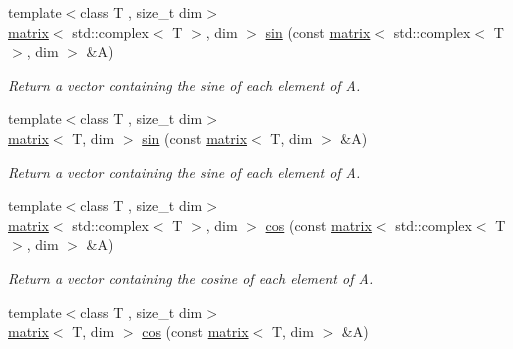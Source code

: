 \begin{DoxyCompactItemize}
\item 
\hypertarget{namespacekeycpp_a18a3ebbda3c25527ae280f5c5725ff4e}{{\footnotesize template$<$class T , size\-\_\-t dim$>$ }\\\hyperlink{classkeycpp_1_1matrix}{matrix}$<$ std\-::complex$<$ T $>$, dim $>$ \hyperlink{namespacekeycpp_a18a3ebbda3c25527ae280f5c5725ff4e}{sin} (const \hyperlink{classkeycpp_1_1matrix}{matrix}$<$ std\-::complex$<$ T $>$, dim $>$ \&A)}\label{namespacekeycpp_a18a3ebbda3c25527ae280f5c5725ff4e}

\begin{DoxyCompactList}\small\item\em Return a vector containing the sine of each element of A. \end{DoxyCompactList}\item 
\hypertarget{namespacekeycpp_aedb234b850e34f9331031d39084fdbb0}{{\footnotesize template$<$class T , size\-\_\-t dim$>$ }\\\hyperlink{classkeycpp_1_1matrix}{matrix}$<$ T, dim $>$ \hyperlink{namespacekeycpp_aedb234b850e34f9331031d39084fdbb0}{sin} (const \hyperlink{classkeycpp_1_1matrix}{matrix}$<$ T, dim $>$ \&A)}\label{namespacekeycpp_aedb234b850e34f9331031d39084fdbb0}

\begin{DoxyCompactList}\small\item\em Return a vector containing the sine of each element of A. \end{DoxyCompactList}\item 
\hypertarget{namespacekeycpp_a918a1ad9493c25e0afb4d2a37af24d25}{{\footnotesize template$<$class T , size\-\_\-t dim$>$ }\\\hyperlink{classkeycpp_1_1matrix}{matrix}$<$ std\-::complex$<$ T $>$, dim $>$ \hyperlink{namespacekeycpp_a918a1ad9493c25e0afb4d2a37af24d25}{cos} (const \hyperlink{classkeycpp_1_1matrix}{matrix}$<$ std\-::complex$<$ T $>$, dim $>$ \&A)}\label{namespacekeycpp_a918a1ad9493c25e0afb4d2a37af24d25}

\begin{DoxyCompactList}\small\item\em Return a vector containing the cosine of each element of A. \end{DoxyCompactList}\item 
\hypertarget{namespacekeycpp_a882ae0fcbeee4b61db0483546cf76021}{{\footnotesize template$<$class T , size\-\_\-t dim$>$ }\\\hyperlink{classkeycpp_1_1matrix}{matrix}$<$ T, dim $>$ \hyperlink{namespacekeycpp_a882ae0fcbeee4b61db0483546cf76021}{cos} (const \hyperlink{classkeycpp_1_1matrix}{matrix}$<$ T, dim $>$ \&A)}\label{namespacekeycpp_a882ae0fcbeee4b61db0483546cf76021}


\end{DoxyCompactItemize}
